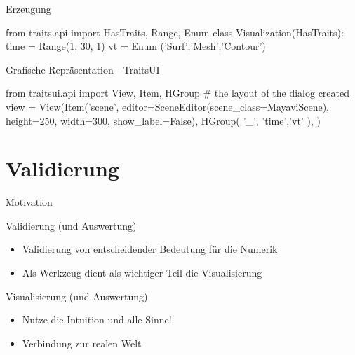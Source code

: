 \documentclass[hyperref={xetex}]{beamer}
\begin{document}
\begin{frame}[fragile]{Erzeugung}

  \begin{pyin}
from traits.api import HasTraits, Range, Enum
class Visualization(HasTraits):
      time = Range(1, 30, 1)
      vt = Enum ('Surf','Mesh','Contour')
  \end{pyin}
\end{frame}

\begin{frame}[fragile]{Grafische Repräsentation - TraitsUI}
  \begin{pyin}
from traitsui.api import View, Item, HGroup
# the layout of the dialog created
    view = View(Item('scene', editor=SceneEditor(scene_class=MayaviScene),
                    height=250, width=300, show_label=False),
                HGroup(
                        '_', 'time','vt'
                    ),
                )    
  \end{pyin}
\end{frame}

\section{Validierung}

\begin{frame}{Motivation}
  \begin{block}{Validierung (und Auswertung)}
\begin{itemize}
  \item Validierung von entscheidender Bedeutung für die Numerik
  \item Als Werkzeug dient als wichtiger Teil die Visualisierung 
\end{itemize}
  \end{block}
  \begin{block}{Visualisierung (und Auswertung)}
    \begin{itemize}
  \item Nutze die Intuition und alle Sinne!
      \item Verbindung zur realen Welt
    \end{itemize}
  \end{block}
\end{frame}
\end{document}
